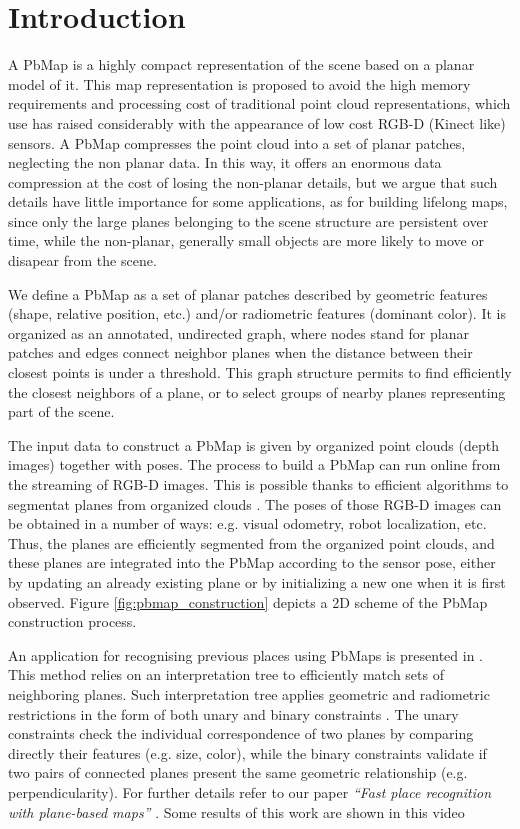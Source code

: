 \documentclass[a4paper,11pt]{article}
\begin{document}
\section{Introduction}

A PbMap is a highly compact representation of the scene based on a planar model of it. This map representation is proposed to avoid the high memory requirements and processing cost of traditional point cloud representations, which use has raised considerably with the appearance of low cost RGB-D (Kinect like) sensors. A PbMap compresses the point cloud into a set of planar patches, neglecting the non planar data. In this way, it offers an enormous data compression at the cost of losing the non-planar details, but we argue that such details have little importance for some applications, as for building lifelong maps, since only the large planes belonging to the scene structure are persistent over time, while the non-planar, generally small objects are more likely to move or disapear from the scene.

We define a PbMap as a set of planar patches described by geometric features (shape, relative position, etc.) and/or radiometric features (dominant color). It is organized as an annotated, undirected graph, where nodes stand for planar patches and edges connect neighbor planes when the distance between their closest points is under a threshold. This graph structure permits to find efficiently the closest neighbors of a plane, or to select groups of nearby planes representing part of the scene.

The input data to construct a PbMap is given by organized point clouds (depth images) together with poses. The process to build a PbMap can run online from the streaming of RGB-D images. This is possible thanks to efficient algorithms to segmentat planes from organized clouds \cite{holz2012fast}. The poses of those RGB-D images can be obtained in a number of ways: e.g. visual odometry, robot localization, etc. Thus, the planes are efficiently segmented from the organized point clouds, and these planes are  integrated into the PbMap according to the sensor pose, either by updating an already existing plane or by initializing a new one when it is first observed. Figure \ref{fig:pbmap_construction} depicts a 2D scheme of the PbMap construction process.

An application for recognising previous places using PbMaps is presented in \cite{fdez2013PbMap}. This method relies on an interpretation tree to efficiently match sets of neighboring planes. Such interpretation tree applies geometric and radiometric restrictions in the form of both unary and binary constraints \cite{grimson1990}. The unary constraints check the individual correspondence of two planes by comparing directly their features (e.g. size, color), while the binary constraints validate if two pairs of connected planes present the same geometric relationship (e.g. perpendicularity). For further details refer to our paper \emph{“Fast place recognition with plane-based maps”} \cite{fdez2013PbMap}. Some results of this work are shown in this video %
\end{document}
